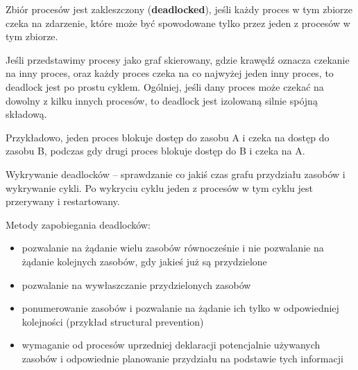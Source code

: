 Zbiór procesów jest zakleszczony (\textbf{deadlocked}), jeśli każdy proces w tym zbiorze czeka na zdarzenie, które może być spowodowane tylko przez jeden z procesów w tym zbiorze.

Jeśli przedstawimy procesy jako graf skierowany, gdzie krawędź oznacza czekanie na inny proces, oraz każdy proces czeka na co najwyżej jeden inny proces, to deadlock jest po prostu cyklem. Ogólniej, jeśli dany proces może czekać na dowolny z kilku innych procesów, to deadlock jest izolowaną silnie spójną składową.

Przykładowo, jeden proces blokuje dostęp do zasobu A i czeka na dostęp do zasobu B, podczas gdy drugi proces blokuje dostęp do B i czeka na A.

Wykrywanie deadlocków -- sprawdzanie co jakiś czas grafu przydziału zasobów i wykrywanie cykli. Po wykryciu cyklu jeden z procesów w tym cyklu jest przerywany i restartowany.

Metody zapobiegania deadlocków:
\begin{itemize}
	\item pozwalanie na żądanie wielu zasobów równocześnie i nie pozwalanie na żądanie kolejnych zasobów, gdy jakieś już są przydzielone
	\item pozwalanie na wywłaszczanie przydzielonych zasobów
	\item ponumerowanie zasobów i pozwalanie na żądanie ich tylko w odpowiedniej kolejności (przykład structural prevention)
	\item wymaganie od procesów uprzedniej deklaracji potencjalnie używanych zasobów i odpowiednie planowanie przydziału na podstawie tych informacji
\end{itemize}